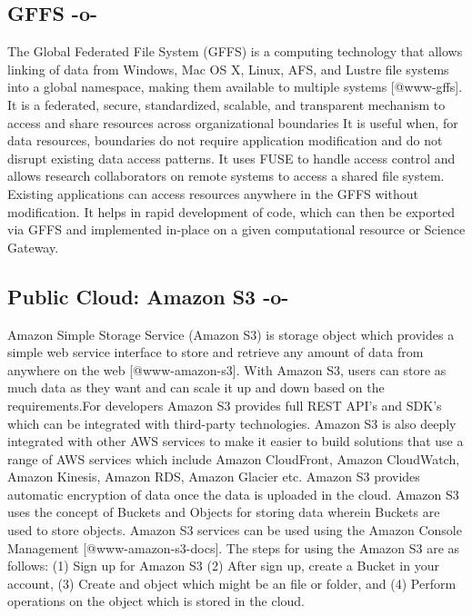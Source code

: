 \subsection{GFFS -o-}

The Global Federated File System (GFFS) is a computing technology that
allows linking of data from Windows, Mac OS X, Linux, AFS, and Lustre
file systems into a global namespace, making them available to
multiple systems [@www-gffs].  It is a federated, secure,
standardized, scalable, and transparent mechanism to access and share
resources across organizational boundaries It is useful when, for data
resources, boundaries do not require application modification and do
not disrupt existing data access patterns. It uses FUSE to handle
access control and allows research collaborators on remote systems to
access a shared file system. Existing applications can access
resources anywhere in the GFFS without modification. It helps in rapid
development of code, which can then be exported via GFFS and
implemented in-place on a given computational resource or Science
Gateway.


     
\subsection{Public Cloud: Amazon S3 -o-}

Amazon Simple Storage Service (Amazon S3) is storage object which
provides a simple web service interface to store and retrieve any
amount of data from anywhere on the web [@www-amazon-s3]. With
Amazon S3, users can store as much data as they want and can scale it
up and down based on the requirements.For developers Amazon S3
provides full REST API's and SDK's which can be integrated with
third-party technologies. Amazon S3 is also deeply integrated with
other AWS services to make it easier to build solutions that use a
range of AWS services which include Amazon CloudFront, Amazon
CloudWatch, Amazon Kinesis, Amazon RDS, Amazon Glacier etc. Amazon S3
provides automatic encryption of data once the data is uploaded in the
cloud. Amazon S3 uses the concept of Buckets and Objects for storing
data wherein Buckets are used to store objects. Amazon S3 services can
be used using the Amazon Console
Management [@www-amazon-s3-docs]. The steps for using the Amazon
S3 are as follows: (1) Sign up for Amazon S3 (2) After sign up, create
a Bucket in your account, (3) Create and object which might be an file
or folder, and (4) Perform operations on the object which is stored in
the cloud.



